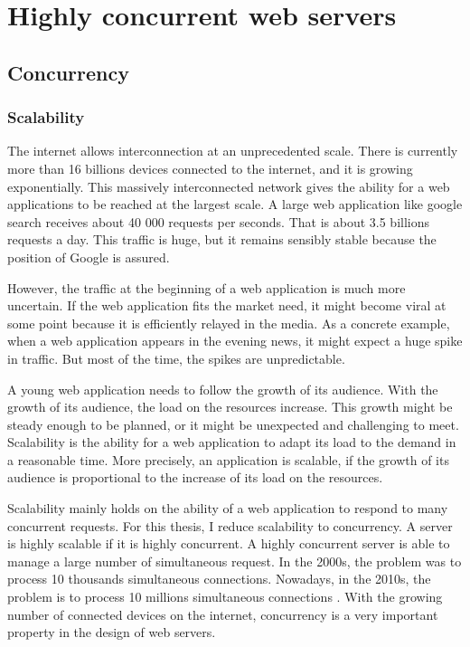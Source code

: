 
\section{Highly concurrent web servers}

\subsection{Concurrency}

\subsubsection{Scalability}

The internet allows interconnection at an unprecedented scale.
There is currently more than 16 billions devices connected to the internet, and it is growing exponentially.
This massively interconnected network gives the ability for a web applications to be reached at the largest scale.
A large web application like google search receives about 40 000 requests per seconds.
That is about 3.5 billions requests a day.
This traffic is huge, but it remains sensibly stable because the position of Google is assured.


However, the traffic at the beginning of a web application is much more uncertain.
If the web application fits the market need, it might become viral at some point because it is efficiently relayed in the media.
As a concrete example, when a web application appears in the evening news, it might expect a huge spike in traffic.
But most of the time, the spikes are unpredictable.

A young web application needs to follow the growth of its audience.
With the growth of its audience, the load on the resources increase.
This growth might be steady enough to be planned, or it might be unexpected and challenging to meet.
Scalability is the ability for a web application to adapt its load to the demand in a reasonable time.
More precisely, an application is scalable, if the growth of its audience is proportional to the increase of its load on the resources.

Scalability mainly holds on the ability of a web application to respond to many concurrent requests.
For this thesis, I reduce scalability to concurrency.
A server is highly scalable if it is highly concurrent.
A highly concurrent server is able to manage a large number of simultaneous request.
In the 2000s, the problem was to process 10 thousands simultaneous connections.
Nowadays, in the 2010s, the problem is to process 10 millions simultaneous connections .
With the growing number of connected devices on the internet, concurrency is a very important property in the design of web servers.

